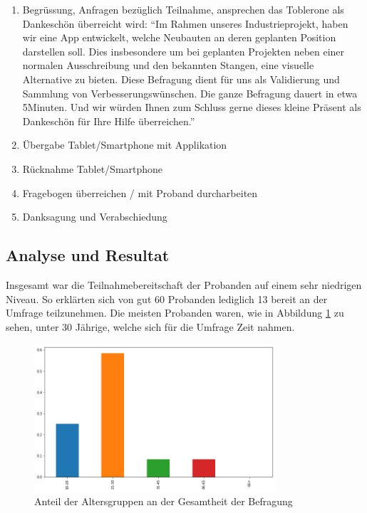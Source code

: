\documentclass[a4paper]{scrreprt}
\begin{document}
\begin{enumerate}
	\item Begrüssung, Anfragen bezüglich Teilnahme, ansprechen das Toblerone als Dankeschön überreicht wird:
	\textquotedblleft Im Rahmen unseres Industrieprojekt, haben wir eine App entwickelt, welche Neubauten an deren geplanten Position darstellen soll. Dies insbesondere um bei geplanten Projekten neben einer normalen Ausschreibung und den bekannten Stangen, eine visuelle Alternative zu bieten. Diese Befragung dient für uns als Validierung und Sammlung von Verbesserungswünschen.
	Die ganze Befragung dauert in etwa 5Minuten. Und wir würden Ihnen zum Schluss gerne dieses kleine Präsent als Dankeschön für Ihre Hilfe überreichen.\textquotedblright
	\item Übergabe Tablet/Smartphone mit Applikation
	\item Rücknahme Tablet/Smartphone
	\item Fragebogen überreichen / mit Proband durcharbeiten
	\item Danksagung und Verabschiedung
\end{enumerate}

\subsection{Analyse und Resultat}

Insgesamt war die Teilnahmebereitschaft der Probanden auf einem sehr niedrigen Niveau. So erklärten sich von gut 60 Probanden lediglich 13 bereit an der Umfrage teilzunehmen. Die meisten Probanden waren, wie in Abbildung \ref{fig:Altersgruppen} zu sehen, unter 30 Jährige, welche sich für die Umfrage Zeit nahmen.

\begin{figure}[htb]
	\centering
	\includegraphics[keepaspectratio, width=0.8\textwidth]{Altersgruppen.png}
	\caption{Anteil der Altersgruppen an der Gesamtheit der Befragung}
	\label{fig:Altersgruppen}
\end{figure}
\end{document}
